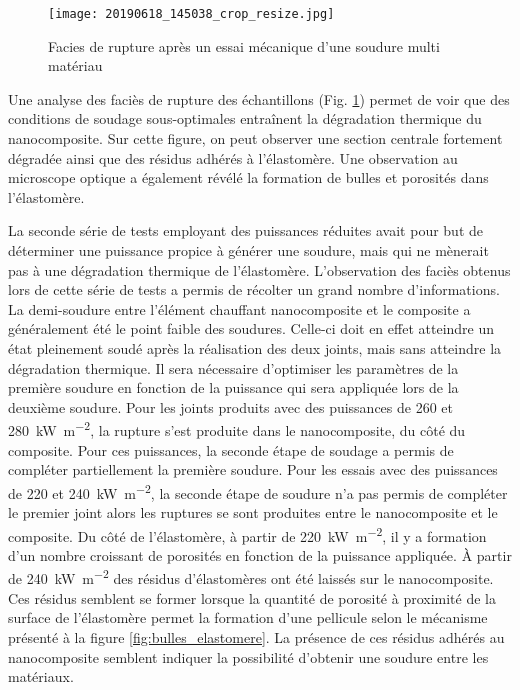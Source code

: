 \begin{figure}[h]
	\centering
	\texttt{[image: 20190618\_145038\_crop\_resize.jpg]}
	\caption{Facies de rupture après un essai mécanique d'une soudure multi matériau}
	\label{fig:facies_multi_materiau}
\end{figure}

Une analyse des faciès de rupture des échantillons (Fig. \ref{fig:facies_multi_materiau}) permet de voir que des conditions de soudage sous-optimales entraînent la dégradation thermique du nanocomposite. 
Sur cette figure, on peut observer une section centrale fortement dégradée ainsi que des résidus adhérés à l'élastomère. 
Une observation au microscope optique a également révélé la formation de bulles et porosités dans l'élastomère. 

La seconde série de tests employant des puissances réduites avait pour but de déterminer une puissance propice à générer une soudure, mais qui ne mènerait pas à une dégradation thermique de l'élastomère. 
L'observation des faciès obtenus lors de cette série de tests a permis de récolter un grand nombre d'informations. 
La demi-soudure entre l'élément chauffant nanocomposite et le composite a généralement été le point faible des soudures. 
Celle-ci doit en effet atteindre un état pleinement soudé après la réalisation des deux joints, mais sans atteindre la dégradation thermique. 
Il sera nécessaire d'optimiser les paramètres de la première soudure en fonction de la puissance qui sera appliquée lors de la deuxième soudure. 
Pour les joints produits avec des puissances de 260 et \SI{280}{\kilo\watt\per\square\metre}, la rupture s'est produite dans le nanocomposite, du côté du composite. 
Pour ces puissances, la seconde étape de soudage a permis de compléter partiellement la première soudure. 
Pour les essais avec des puissances de 220 et \SI{240}{\kilo\watt\per\square\metre}, la seconde étape de soudure n'a pas permis de compléter le premier joint alors les ruptures se sont produites entre le nanocomposite et le composite. 
Du côté de l'élastomère, à partir de \SI{220}{\kilo\watt\per\square\metre}, il y a formation d'un nombre croissant de porosités en fonction de la puissance appliquée. 
À partir de \SI{240}{\kilo\watt\per\square\metre} des résidus d'élastomères ont été laissés sur le nanocomposite. 
Ces résidus semblent se former lorsque la quantité de porosité à proximité de la surface de l'élastomère permet la formation d'une pellicule selon le mécanisme présenté à la figure \ref{fig:bulles_elastomere}. 
La présence de ces résidus adhérés au nanocomposite semblent indiquer la possibilité d'obtenir une soudure entre les matériaux. 

